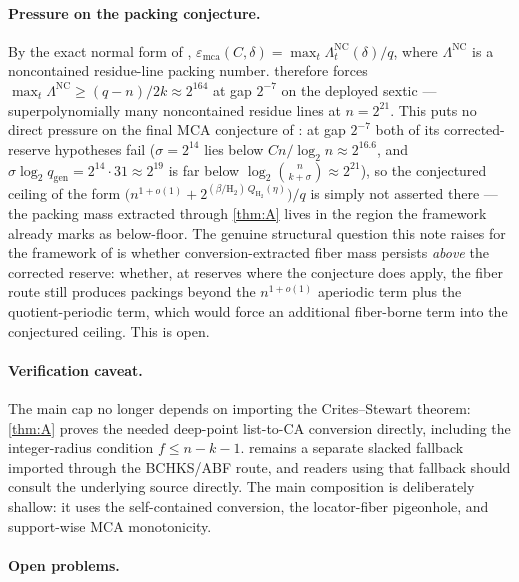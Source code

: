 \documentclass[11pt]{article}
\theoremstyle{definition}
\theoremstyle{remark}
\newcommand{\emca}{\varepsilon_{\mathrm{mca}}}
\newcommand{\Hb}{\mathrm{H}_2}
\begin{document}
\paragraph{Pressure on the packing conjecture.}
By the exact normal form of \cite{Cho26b}, $\emca(C,\delta)=\max_t\Lambda^{\mathrm{NC}}_t(\delta)/q$, where $\Lambda^{\mathrm{NC}}$ is a noncontained residue-line packing number.  therefore forces $\max_t\Lambda^{\mathrm{NC}}\ge(q-n)/2k\approx2^{164}$ at gap $2^{-7}$ on the deployed sextic --- superpolynomially many noncontained residue lines at $n=2^{21}$. This puts no direct pressure on the final MCA conjecture of \cite[Conj.\ ``Final floor- and quotient-corrected MCA asymptotic'']{Cho26b}: at gap $2^{-7}$ both of its corrected-reserve hypotheses fail ($\sigma=2^{14}$ lies below $Cn/\log_2n\approx2^{16.6}$, and $\sigma\log_2 q_{\mathrm{gen}}=2^{14}\cdot31\approx2^{19}$ is far below $\log_2\binom n{k+\sigma}\approx2^{21}$), so the conjectured ceiling of the form $\bigl(n^{1+o(1)}+2^{(\beta/\Hb)\,Q_{\Hb}(\eta)}\bigr)/q$ is simply not asserted there --- the packing mass extracted through \cref{thm:A} lives in the region the framework already marks as below-floor. The genuine structural question this note raises for the framework of \cite{Cho26b} is whether conversion-extracted fiber mass persists \emph{above} the corrected reserve: whether, at reserves where the conjecture does apply, the fiber route still produces packings beyond the $n^{1+o(1)}$ aperiodic term plus the quotient-periodic term, which would force an additional fiber-borne term into the conjectured ceiling. This is open.

\paragraph{Verification caveat.}
The main cap no longer depends on importing the Crites--Stewart theorem: \cref{thm:A} proves the needed deep-point list-to-CA conversion directly, including the integer-radius condition $f\le n-k-1$.   remains a separate slacked fallback imported through the BCHKS/ABF route, and readers using that fallback should consult the underlying source directly.  The main composition is deliberately shallow: it uses the self-contained conversion, the locator-fiber pigeonhole, and support-wise MCA monotonicity.

\paragraph{Open problems.}
\end{document}
